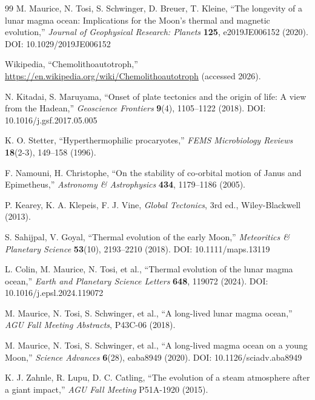 \documentclass[11pt,a4paper]{article}
\begin{document}
\begin{thebibliography}{99}
		M. Maurice, N. Tosi, S. Schwinger, D. Breuer, T. Kleine, ``The longevity of a lunar magma ocean: Implications for the Moon's thermal and magnetic evolution,''
		\emph{Journal of Geophysical Research: Planets} \textbf{125}, e2019JE006152 (2020). DOI: 10.1029/2019JE006152
		
		Wikipedia, ``Chemolithoautotroph,''
		\url{https://en.wikipedia.org/wiki/Chemolithoautotroph} (accessed 2026).
		
		N. Kitadai, S. Maruyama, ``Onset of plate tectonics and the origin of life: A view from the Hadean,''
		\emph{Geoscience Frontiers} \textbf{9}(4), 1105–1122 (2018). DOI: 10.1016/j.gsf.2017.05.005
		
		K. O. Stetter, ``Hyperthermophilic procaryotes,''
		\emph{FEMS Microbiology Reviews} \textbf{18}(2-3), 149–158 (1996).
		
		F. Namouni, H. Christophe, ``On the stability of co‑orbital motion of Janus and Epimetheus,''
		\emph{Astronomy \& Astrophysics} \textbf{434}, 1179–1186 (2005).
		
		P. Kearey, K. A. Klepeis, F. J. Vine, \emph{Global Tectonics}, 3rd ed., Wiley-Blackwell (2013).
		
		S. Sahijpal, V. Goyal, ``Thermal evolution of the early Moon,''
		\emph{Meteoritics \& Planetary Science} \textbf{53}(10), 2193–2210 (2018).
		DOI: 10.1111/maps.13119
		
		L. Colin, M. Maurice, N. Tosi, et al., ``Thermal evolution of the lunar magma ocean,''
		\emph{Earth and Planetary Science Letters} \textbf{648}, 119072 (2024).
		DOI: 10.1016/j.epsl.2024.119072
		
		M. Maurice, N. Tosi, S. Schwinger, et al., ``A long-lived lunar magma ocean,''
		\emph{AGU Fall Meeting Abstracts}, P43C-06 (2018).
		
		M. Maurice, N. Tosi, S. Schwinger, et al., ``A long-lived magma ocean on a young Moon,''
		\emph{Science Advances} \textbf{6}(28), eaba8949 (2020).
		DOI: 10.1126/sciadv.aba8949
		
		K. J. Zahnle, R. Lupu, D. C. Catling, ``The evolution of a steam atmosphere after a giant impact,''
		\emph{AGU Fall Meeting} P51A-1920 (2015).
		

\end{thebibliography}
\end{document}
